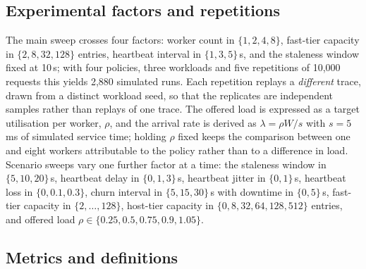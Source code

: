 \documentclass[10pt,twocolumn]{article}
\begin{document}
\subsection{Experimental factors and repetitions}

The main sweep crosses four factors: worker count in $\{1,2,4,8\}$, fast-tier
capacity in $\{2,8,32,128\}$ entries, heartbeat interval in $\{1,3,5\}$\,s,
and the staleness window fixed at 10\,s; with four policies, three workloads
and five repetitions of 10{,}000 requests this yields 2{,}880 simulated runs.
Each repetition replays a \emph{different} trace, drawn from a distinct
workload seed, so that the replicates are independent samples rather than
replays of one trace. The offered load is expressed as a target utilisation per
worker, $\rho$, and the arrival rate is derived as
$\lambda = \rho W / s$ with $s = 5$\,ms of simulated service time; holding
$\rho$ fixed keeps the comparison between one and eight workers attributable
to the policy rather than to a difference in load. Scenario sweeps vary one
further factor at a time: the staleness window in $\{5,10,20\}$\,s, heartbeat
delay in $\{0,1,3\}$\,s, heartbeat jitter in $\{0,1\}$\,s, heartbeat loss in
$\{0,0.1,0.3\}$, churn interval in $\{5,15,30\}$\,s with downtime in
$\{0,5\}$\,s, fast-tier capacity in $\{2,\dots,128\}$, host-tier capacity in
$\{0,8,32,64,128,512\}$ entries, and offered load
$\rho \in \{0.25,0.5,0.75,0.9,1.05\}$.

\subsection{Metrics and definitions}
\end{document}
